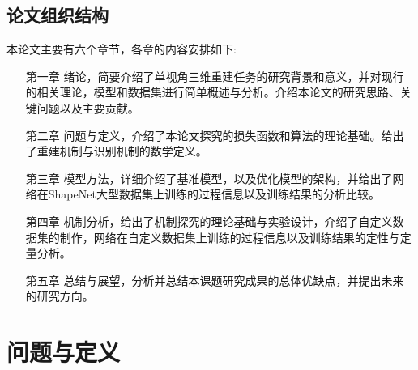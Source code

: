 \documentclass[bachelor, nocolorlinks, printoneside]{seuthesis} %
\begin{document}
\begin{Main}
\section{论文组织结构}
本论文主要有六个章节，各章的内容安排如下:
\begin{itemize}[\hspace{2cm}]
    \item[第一章] 绪论，简要介绍了单视角三维重建任务的研究背景和意义，并对现行的相关理论，模型和数据集进行简单概述与分析。介绍本论文的研究思路、关键问题以及主要贡献。
    \item[第二章] 问题与定义，介绍了本论文探究的损失函数和算法的理论基础。给出了重建机制与识别机制的数学定义。
    \item[第三章] 模型方法，详细介绍了基准模型，以及优化模型的架构，并给出了网络在ShapeNet大型数据集上训练的过程信息以及训练结果的分析比较。
    \item[第四章] 机制分析，给出了机制探究的理论基础与实验设计，介绍了自定义数据集的制作，网络在自定义数据集上训练的过程信息以及训练结果的定性与定量分析。
    \item[第五章] 总结与展望，分析并总结本课题研究成果的总体优缺点，并提出未来的研究方向。
\end{itemize}


\chapter{问题与定义}

\end{Main}
\end{document}
